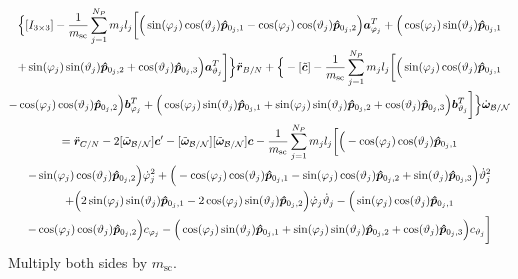 \begin{multline}
	\Big\{[I_{3\times3}] -\frac{1}{m_{\text{sc}}}\sum_{j=1}^{N_{P}}m_j l_j \bigg[
	\Big(\sin(\varphi_j)\cos(\vartheta_j)\bm{\hat{p}}_{0_j,1}-\cos(\varphi_j)\cos(\vartheta_j)\bm{\hat{p}}_{0_j,2}\Big)\bm a_{\varphi_j}^T +\Big(\cos(\varphi_j)\sin(\vartheta_j)\bm{\hat{p}}_{0_j,1}\\+\sin(\varphi_j)\sin(\vartheta_j)\bm{\hat{p}}_{0_j,2}+\cos(\vartheta_j)\bm{\hat{p}}_{0_j,3}\Big)\bm a_{\vartheta_j}^T \bigg]\Big\}\ddot{\bm r}_{B/N}
	+\Big\{-[\tilde{\bm{c}}] -\frac{1}{m_{\text{sc}}}\sum_{j=1}^{N_{P}}m_j l_j \bigg[
	\Big(\sin(\varphi_j)\cos(\vartheta_j)\bm{\hat{p}}_{0_j,1}\\-\cos(\varphi_j)\cos(\vartheta_j)\bm{\hat{p}}_{0_j,2}\Big)\bm b_{\varphi_j}^T +\Big(\cos(\varphi_j)\sin(\vartheta_j)\bm{\hat{p}}_{0_j,1}+\sin(\varphi_j)\sin(\vartheta_j)\bm{\hat{p}}_{0_j,2}+\cos(\vartheta_j)\bm{\hat{p}}_{0_j,3}\Big)\bm b_{\vartheta_j}^T \bigg] \Big\}\dot{\bm\omega}_{\cal B/N}
	\\= \ddot{\bm r}_{C/N} 	- 2[\tilde{\bm\omega}_{\cal B/N}] \bm c'
	-[\tilde{\bm\omega}_{\cal B/N}][\tilde{\bm\omega}_{\cal B/N}]\bm{c}
	-\frac{1}{m_{\text{sc}}}\sum_{j=1}^{N_{P}}m_j l_j \bigg[ 
	\Big(-\cos(\varphi_j)\cos(\vartheta_j)\bm{\hat{p}}_{0_j,1}\\-\sin(\varphi_j)\cos(\vartheta_j)\bm{\hat{p}}_{0_j,2}\Big)\dot{\varphi}_j^2
	+\Big(-\cos(\varphi_j)\cos(\vartheta_j)\bm{\hat{p}}_{0_j,1}-\sin(\varphi_j)\cos(\vartheta_j)\bm{\hat{p}}_{0_j,2}+\sin(\vartheta_j)\bm{\hat{p}}_{0_j,3} \Big)\dot{\vartheta}_j^2 \\+
	\Big(2\sin(\varphi_j)\sin(\vartheta_j)\bm{\hat{p}}_{0_j,1} -2\cos(\varphi_j)\sin(\vartheta_j)\bm{\hat{p}}_{0_j,2}\Big)\dot{\varphi}_j\dot{\vartheta}_j
	-\Big(\sin(\varphi_j)\cos(\vartheta_j)\bm{\hat{p}}_{0_j,1}\\-\cos(\varphi_j)\cos(\vartheta_j)\bm{\hat{p}}_{0_j,2}\Big)c_{\varphi_j} - \Big(\cos(\varphi_j)\sin(\vartheta_j)\bm{\hat{p}}_{0_j,1}+\sin(\varphi_j)\sin(\vartheta_j)\bm{\hat{p}}_{0_j,2}+\cos(\vartheta_j)\bm{\hat{p}}_{0_j,3}\Big) c_{\vartheta_j} 
	\bigg]
	\label{eq:Rbddot6}
\end{multline}
Multiply both sides by $m_{\text{sc}}$.

